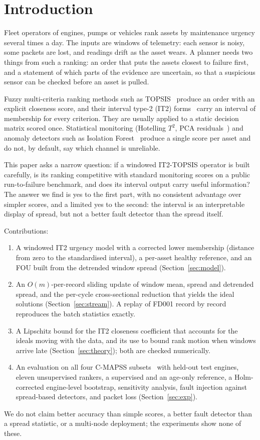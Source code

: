 \documentclass[journal,10pt,twocolumn]{IEEEtran}
\begin{document}
\section{Introduction}
Fleet operators of engines, pumps or vehicles rank assets by maintenance urgency several times a day. The inputs are windows of telemetry: each sensor is noisy, some packets are lost, and readings drift as the asset wears. A planner needs two things from such a ranking: an order that puts the assets closest to failure first, and a statement of which parts of the evidence are uncertain, so that a suspicious sensor can be checked before an asset is pulled.

Fuzzy multi-criteria ranking methods such as TOPSIS~\cite{hwang1981,chen2000} produce an order with an explicit closeness score, and their interval type-2 (IT2) forms~\cite{chen2010it2,celik2015} carry an interval of membership for every criterion. They are usually applied to a static decision matrix scored once. Statistical monitoring (Hotelling $T^2$, PCA residuals~\cite{macgregor1995}) and anomaly detectors such as Isolation Forest~\cite{liu2008iforest} produce a single score per asset and do not, by default, say which channel is unreliable.

This paper asks a narrow question: if a windowed IT2-TOPSIS operator is built carefully, is its ranking competitive with standard monitoring scores on a public run-to-failure benchmark, and does its interval output carry useful information? The answer we find is yes to the first part, with no consistent advantage over simpler scores, and a limited yes to the second: the interval is an interpretable display of spread, but not a better fault detector than the spread itself.

Contributions:
\begin{enumerate}
\item A windowed IT2 urgency model with a corrected lower membership (distance from zero to the standardised interval), a per-asset healthy reference, and an FOU built from the detrended window spread (Section~\ref{sec:model}).
\item An $O(m)$-per-record sliding update of window mean, spread and detrended spread, and the per-cycle cross-sectional reduction that yields the ideal solutions (Section~\ref{sec:stream}). A replay of FD001 record by record reproduces the batch statistics exactly.
\item A Lipschitz bound for the IT2 closeness coefficient that accounts for the ideals moving with the data, and its use to bound rank motion when windows arrive late (Section~\ref{sec:theory}); both are checked numerically.
\item An evaluation on all four C-MAPSS subsets~\cite{saxena2008} with held-out test engines, eleven unsupervised rankers, a supervised and an age-only reference, a Holm-corrected engine-level bootstrap, sensitivity analysis, fault injection against spread-based detectors, and packet loss (Section~\ref{sec:exp}).
\end{enumerate}
We do not claim better accuracy than simple scores, a better fault detector than a spread statistic, or a multi-node deployment; the experiments show none of these.
\end{document}
